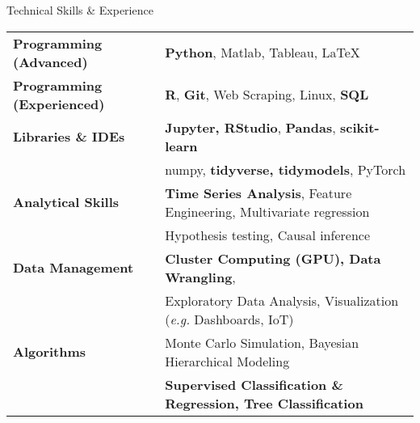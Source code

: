 \documentclass{resume} %
\begin{document}

\begin{rSection}{Technical Skills \& Experience}

\begin{small}

\begin{tabular}{ @{} >{\bfseries}l @{\hspace{6ex}} l }
Programming (Advanced)    & \textbf{Python}, Matlab, Tableau, LaTeX \\ 
Programming (Experienced) & \textbf{R}, \textbf{Git}, Web Scraping, Linux, \textbf{SQL} \\
Libraries \& IDEs         & \textbf{Jupyter, RStudio}, \textbf{Pandas}, \textbf{scikit-learn} \\ & numpy, \textbf{tidyverse, tidymodels}, PyTorch \\
Analytical Skills         & \textbf{Time Series Analysis}, Feature Engineering, Multivariate regression \\ & Hypothesis testing, Causal inference \\
Data Management           & \textbf{Cluster Computing (GPU), Data Wrangling}, \\ & Exploratory Data Analysis, Visualization (\emph{e.g.} Dashboards, IoT) \\
Algorithms                & Monte Carlo Simulation, Bayesian Hierarchical Modeling \\ & \textbf{Supervised Classification \& Regression, Tree Classification} \\
\end{tabular}

\end{small}

\end{rSection}

\end{document}
